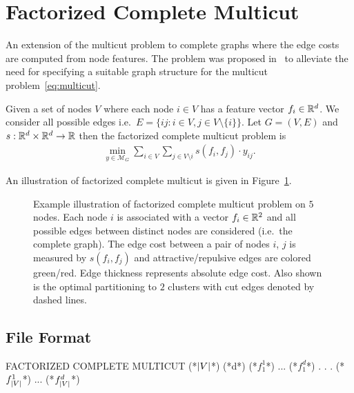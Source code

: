 \section{Factorized Complete Multicut}
\label{sec:complete_multicut}
An extension of the multicut problem to complete graphs where the edge costs are computed from node features. The problem was proposed in~\cite{aabbas23_clusterfug} to alleviate the need for specifying a suitable graph structure for the multicut problem~\eqref{eq:multicut}. 
\begin{definition}
    Given a set of nodes $V$ where each node $i \in V$ has a feature vector $f_i \in \mathbb{R}^d$. We consider all possible edges i.e.\ $E = \{ij : i \in V, j \in V\setminus \{i\} \}$. 
    Let $G = (V, E)$ and $s: \mathbb{R}^d \times \mathbb{R}^d \rightarrow \mathbb{R}$ then the factorized complete multicut problem is
    \begin{equation}
        \label{eq:factorized_complete_multicut}
        \begin{array}{rl}
            \min_{y \in \mathcal{M}_G} \sum\limits_{i \in V} \sum\limits_{j \in V \setminus i} s(f_i, f_j) \cdot y_{ij}.
        \end{array}
    \end{equation}
\end{definition}

An illustration of factorized complete multicut is given in Figure~\ref{fig:factorized-complete-multicut}.

\begin{figure}[H]
    \begin{center}
    \scalebox{1.5}{}
    \end{center}
    \caption{Example illustration of factorized complete multicut problem on $5$ nodes. Each node $i$ is associated with a vector $f_i \in \mathbb{R}^2$ and all possible edges between distinct nodes are considered (i.e.\ the complete graph). The edge cost between a pair of nodes $i$, $j$ is measured by $s(f_i, f_j)$ and attractive/repulsive edges are colored green/red. Edge thickness represents absolute edge cost. Also shown is the optimal partitioning to $2$ clusters with cut edges denoted by dashed lines.}    
    \label{fig:factorized-complete-multicut}
\end{figure}

\subsection{File Format}
\begin{fileformat}
FACTORIZED COMPLETE MULTICUT
(*$\lvert V\rvert$*) (*d*)
(*$f_1^1$*) ... (*$f_1^d$*)
.
.
.
(*$f_{\lvert V\rvert}^1$*) ... (*$f_{\lvert V\rvert}^d$*)
\end{fileformat}
